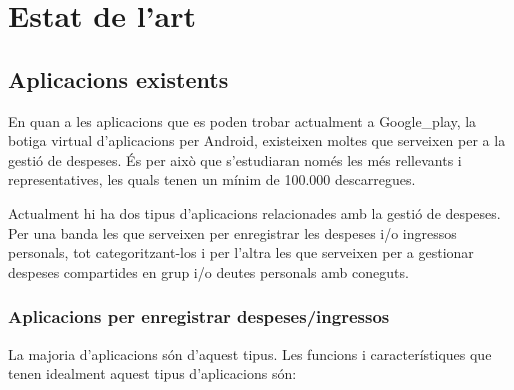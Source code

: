 \chapter{Estat de l'art}
\section{Aplicacions existents}
En quan a les aplicacions que es poden trobar actualment a \gls{Google_play}, la botiga virtual d'aplicacions per \gls{Android}, existeixen moltes que serveixen per a la gestió de despeses. És per això que s'estudiaran només les més rellevants i representatives, les quals tenen un mínim de 100.000 descarregues. 

Actualment hi ha dos tipus d'aplicacions relacionades amb la gestió de despeses. Per una banda les que serveixen per enregistrar les despeses i/o ingressos personals, tot categoritzant-los i per l'altra les que serveixen per a gestionar despeses compartides en grup i/o deutes personals amb coneguts.

\subsection{Aplicacions per enregistrar despeses/ingressos}
La majoria d'aplicacions són d'aquest tipus. Les funcions i característiques que tenen idealment aquest tipus d'aplicacions són:

